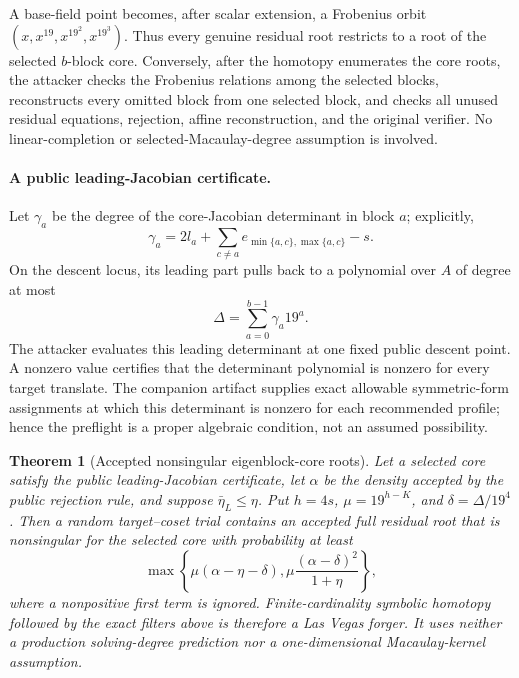 \documentclass[11pt]{article}
\newtheorem{theorem}{Theorem}
\begin{document}
A base-field point becomes, after scalar extension, a Frobenius orbit
$(x,x^{19},x^{19^2},x^{19^3})$.  Thus every genuine residual root restricts
to a root of the selected $b$-block core.  Conversely, after the homotopy
enumerates the core roots, the attacker checks the Frobenius relations among
the selected blocks, reconstructs every omitted block from one selected block,
and checks all unused residual equations, rejection, affine reconstruction,
and the original verifier.  No linear-completion or selected-Macaulay-degree
assumption is involved.

\paragraph{A public leading-Jacobian certificate.}
Let $\gamma_a$ be the degree of the core-Jacobian determinant in block $a$;
explicitly,
\begin{equation}\label{eq:eigenblock-jacobian-multidegree}
 \gamma_a=
 2l_a+\sum_{c\ne a}e_{\min\{a,c\},\max\{a,c\}}-s.
\end{equation}
On the descent locus, its leading part pulls back to a polynomial over $A$ of
degree at most
\begin{equation}\label{eq:eigenblock-descent-degree}
 \Delta=\sum_{a=0}^{b-1}\gamma_a19^a.
\end{equation}
The attacker evaluates this leading determinant at one fixed public descent
point.  A nonzero value certifies that the determinant polynomial is nonzero
for every target translate.  The companion artifact supplies exact allowable
symmetric-form assignments at which this determinant is nonzero for each
recommended profile; hence the preflight is a proper algebraic condition, not
an assumed possibility.

\begin{theorem}[Accepted nonsingular eigenblock-core roots]
\label{thm:eigenblock-core-roots}
Let a selected core satisfy the public leading-Jacobian certificate, let
$\alpha$ be the density accepted by the public rejection rule, and suppose
$\bar\eta_L\le\eta$.  Put $h=4s$, $\mu=19^{h-K}$, and
$\delta=\Delta/19^4$.  Then a random target--coset trial contains an accepted
full residual root that is nonsingular for the selected core with probability
at least
\begin{equation}\label{eq:eigenblock-core-success}
 \max\left\{
   \mu(\alpha-\eta-\delta),
   \mu\frac{(\alpha-\delta)^2}{1+\eta}
 \right\},
\end{equation}
where a nonpositive first term is ignored.  Finite-cardinality symbolic
homotopy followed by the exact filters above is therefore a Las Vegas forger.
It uses neither a production solving-degree prediction nor a one-dimensional
Macaulay-kernel assumption.
\end{theorem}
\end{document}
